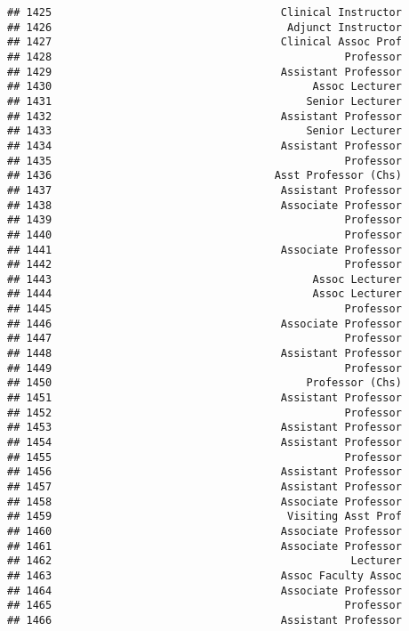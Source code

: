 \documentclass[
]{article}
\begin{document}
\begin{verbatim}
## 1425                                    Clinical Instructor
## 1426                                     Adjunct Instructor
## 1427                                    Clinical Assoc Prof
## 1428                                              Professor
## 1429                                    Assistant Professor
## 1430                                         Assoc Lecturer
## 1431                                        Senior Lecturer
## 1432                                    Assistant Professor
## 1433                                        Senior Lecturer
## 1434                                    Assistant Professor
## 1435                                              Professor
## 1436                                   Asst Professor (Chs)
## 1437                                    Assistant Professor
## 1438                                    Associate Professor
## 1439                                              Professor
## 1440                                              Professor
## 1441                                    Associate Professor
## 1442                                              Professor
## 1443                                         Assoc Lecturer
## 1444                                         Assoc Lecturer
## 1445                                              Professor
## 1446                                    Associate Professor
## 1447                                              Professor
## 1448                                    Assistant Professor
## 1449                                              Professor
## 1450                                        Professor (Chs)
## 1451                                    Assistant Professor
## 1452                                              Professor
## 1453                                    Assistant Professor
## 1454                                    Assistant Professor
## 1455                                              Professor
## 1456                                    Assistant Professor
## 1457                                    Assistant Professor
## 1458                                    Associate Professor
## 1459                                     Visiting Asst Prof
## 1460                                    Associate Professor
## 1461                                    Associate Professor
## 1462                                               Lecturer
## 1463                                    Assoc Faculty Assoc
## 1464                                    Associate Professor
## 1465                                              Professor
## 1466                                    Assistant Professor

\end{verbatim}
\end{document}
